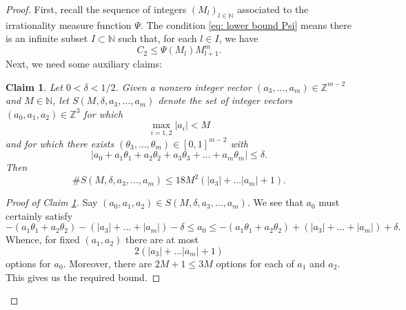 \documentclass[reqno,11pt, twoside]{amsart}
\theoremstyle{plain}
\newtheorem{claim}{Claim}[thm]
\theoremstyle{definition}
\theoremstyle{definition}
\theoremstyle{remark}
\numberwithin{equation}{section}
\newcommand{\Z}{{\mathbb{Z}}}
\newcommand{\N}{{\mathbb{N}}}
\begin{document}
\begin{proof}
    First, recall the sequence of integers $(M_l)_{l \in \N}$ associated to the irrationality measure function $\Psi$.
    The condition \eqref{eq: lower bound Psi} means there is an infinite subset $I \subset \N$ such that, for each $l \in I$, we have
    \begin{equation}\label{eq: nonsingular hypothesis Mn}
        C_2 \leq \Psi(M_{l}) M_{l+1}^m.
    \end{equation}
    Next, we need some auxiliary claims:
    \begin{claim}\label{claim: aux 1}
        Let $0 < \delta < 1/2$. Given a nonzero integer vector $(a_3,\dots, a_m) \in \Z^{m-2}$ and $M \in \N$, let $S(M, \delta,a_3,\dots, a_m)$ denote the set of integer vectors $(a_0, a_1, a_2) \in \Z^3$ for which
        \begin{equation*}
            \max_{i=1,2} |a_i| < M
        \end{equation*}
        and for which there exists $(\theta_3, \dots, \theta_m) \in [0,1]^{m-2}$ with 
        \begin{equation*}
            |a_0 +  a_1 \theta_1 + a_2 \theta_2 + a_3 \theta_3 + \dots + a_m \theta_m| \leq \delta.
        \end{equation*}
        Then 
        \begin{equation*}
            \# S(M, \delta,a_3, \dots, a_m) \leq 18 M^2 (|a_3| + \dots |a_m| + 1).
        \end{equation*}
    \end{claim}
    \begin{proof}[Proof of Claim \ref{claim: aux 1}] 
        Say $(a_0, a_1, a_2) \in S(M, \delta, a_3,\dots, a_m)$.
        We see that $a_0$ must certainly satisfy
        \begin{equation*}
           - (a_1 \theta_1 + a_2 \theta_2)  - (|a_3| + \dots +|a_m|) - \delta \leq a_0 \leq 
            - (a_1 \theta_1 + a_2 \theta_2) + (|a_3| + \dots +|a_m|) + \delta.
        \end{equation*}
        Whence, for fixed $(a_1, a_2)$ there are at most
        \begin{equation*}
            2(|a_3| + \dots |a_m|+1)
        \end{equation*} 
        options for $a_0$. Moreover, there are $2M+1 \leq 3M$ options for each of $a_1$ and $a_2$. This gives us the required bound.
    \end{proof}



\end{proof}
\end{document}
